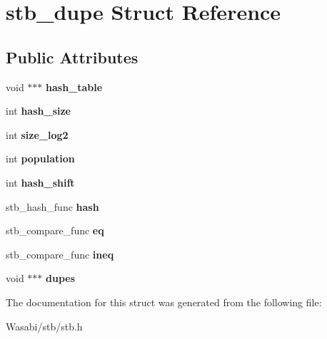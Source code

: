 \hypertarget{structstb__dupe}{}\section{stb\+\_\+dupe Struct Reference}
\label{structstb__dupe}
\subsection*{Public Attributes}
\begin{DoxyCompactItemize}
\item 
void $\ast$$\ast$$\ast$ {\bfseries hash\+\_\+table}\hypertarget{structstb__dupe_a3190e0c8a4e80faac34e602b091c701a}{}\label{structstb__dupe_a3190e0c8a4e80faac34e602b091c701a}

\item 
int {\bfseries hash\+\_\+size}\hypertarget{structstb__dupe_af78a91edcb8f7c5b04c298901b681ff1}{}\label{structstb__dupe_af78a91edcb8f7c5b04c298901b681ff1}

\item 
int {\bfseries size\+\_\+log2}\hypertarget{structstb__dupe_af33ab09b9ca1ec49a01e240e8c771687}{}\label{structstb__dupe_af33ab09b9ca1ec49a01e240e8c771687}

\item 
int {\bfseries population}\hypertarget{structstb__dupe_a919fd05ace44a8175d1c3d2975ae52b2}{}\label{structstb__dupe_a919fd05ace44a8175d1c3d2975ae52b2}

\item 
int {\bfseries hash\+\_\+shift}\hypertarget{structstb__dupe_a3854a8d4f4e46fdcc5c5041361160d8e}{}\label{structstb__dupe_a3854a8d4f4e46fdcc5c5041361160d8e}

\item 
stb\+\_\+hash\+\_\+func {\bfseries hash}\hypertarget{structstb__dupe_a6abcb39ad7f7e2de734086c8f344c717}{}\label{structstb__dupe_a6abcb39ad7f7e2de734086c8f344c717}

\item 
stb\+\_\+compare\+\_\+func {\bfseries eq}\hypertarget{structstb__dupe_a9331ba447a7ad8799400dde065274e23}{}\label{structstb__dupe_a9331ba447a7ad8799400dde065274e23}

\item 
stb\+\_\+compare\+\_\+func {\bfseries ineq}\hypertarget{structstb__dupe_a70d2f3b73f6e22f62acc82acadf8e054}{}\label{structstb__dupe_a70d2f3b73f6e22f62acc82acadf8e054}

\item 
void $\ast$$\ast$$\ast$ {\bfseries dupes}\hypertarget{structstb__dupe_af5f211456f48da1134e89541c225dbe6}{}\label{structstb__dupe_af5f211456f48da1134e89541c225dbe6}

\end{DoxyCompactItemize}


The documentation for this struct was generated from the following file\+:\begin{DoxyCompactItemize}
\item 
Wasabi/stb/stb.\+h\end{DoxyCompactItemize}
